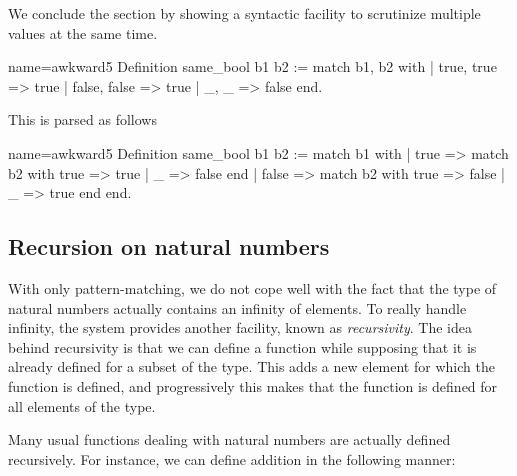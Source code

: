 We conclude the section by showing a syntactic facility to scrutinize
multiple values at the same time.

\begin{coq}{name=awkward5}{}
Definition same_bool b1 b2 :=
  match b1, b2 with
  | true, true => true
  | false, false => true
  | _, _ => false
  end.
\end{coq}

This is parsed as follows

\begin{coq}{name=awkward5}{}
Definition same_bool b1 b2 :=
  match b1 with
  | true => match b2 with true => true | _ => false end
  | false => match b2 with true => false | _ => true end
  end.
\end{coq}


\subsection{Recursion on natural numbers}\label{ssec:recnat}


With only pattern-matching, we do not cope well with the fact that the
type  of natural numbers actually contains an infinity of
elements.  To really handle infinity, the \Coq{} system provides another
facility, known as {\em recursivity}.  The idea behind recursivity is
that we can define a function while supposing that it is already
defined for a subset of the type.  This adds a new element for which
the function is defined, and progressively this makes that the
function is defined for all elements of the type.

Many usual functions dealing with natural numbers are actually
defined recursively.  For instance, we can define addition in the
following manner:

